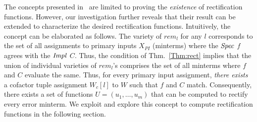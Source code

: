 The concepts presented in~\cite{Vkrao:ISQED21} are limited to
proving the {\it existence} of rectification functions.
However, our investigation further reveals that their result
can be extended to characterize the desired rectification functions.
Intuitively, the concept can be elaborated as follows.
The variety of $rem_l$ for any $l$ corresponds to the set of
all assignments to primary inputs $X_{PI}$ (minterms) where the
${\it Spec}$ $f$ agrees with the ${\it Impl}$ $C$. Thus, the
condition of Thm.~\ref{Thm:rect} implies that the union of individual
varieties of $rem_l$'s comprises the set of all minterms where $f$ and $C$ evaluate the same. 
Thus, for every primary input assignment, {\it there exists} a cofactor tuple
assignment $W_c[l]$ to $W$ such that $f$ and $C$ match. Consequently, there
exists a set of functions $U = (u_1,\dots,u_m)$ that can be computed to 
rectify every error minterm. We exploit and explore this concept 
to compute rectification functions in the following section.

